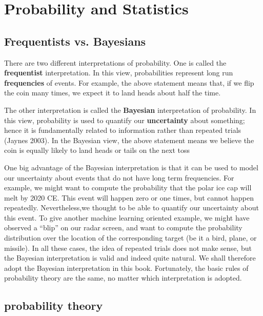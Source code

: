 \chapter{Probability and Statistics}
\label{chap:Probability and Statistics}

\section{Frequentists vs. Bayesians}
There are two different interpretations of probability.
One is called the \textbf{frequentist} interpretation. In this view, probabilities represent long run \textbf{frequencies} of events. For example, the above statement means that, if we flip the coin many times, we expect it to land heads about half the time.

The other interpretation is called the \textbf{Bayesian} interpretation of probability. In this view, probability is used to quantify our \textbf{uncertainty} about something; hence it is fundamentally related to information rather than repeated trials (Jaynes 2003). In the Bayesian view, the above statement means we believe the coin is equally likely to land heads or tails on the next toss

One big advantage of the Bayesian interpretation is that it can be used to model our uncertainty about events that do not have long term frequencies. For example, we might want to compute the probability that the polar ice cap will melt by 2020 CE. This event will happen zero or one times, but cannot happen repeatedly. Nevertheless,we thought to be able to quantify our uncertainty about this event. To give another machine learning oriented example, we might have observed a “blip” on our radar screen, and want to compute the
probability distribution over the location of the corresponding target (be it a bird, plane, or missile). In all these cases, the idea of repeated trials does not make sense, but the Bayesian interpretation is valid and indeed quite natural. We shall therefore adopt the Bayesian interpretation in this book. Fortunately, the
basic rules of probability theory are the same, no matter which interpretation is adopted.


\section{probability theory}

